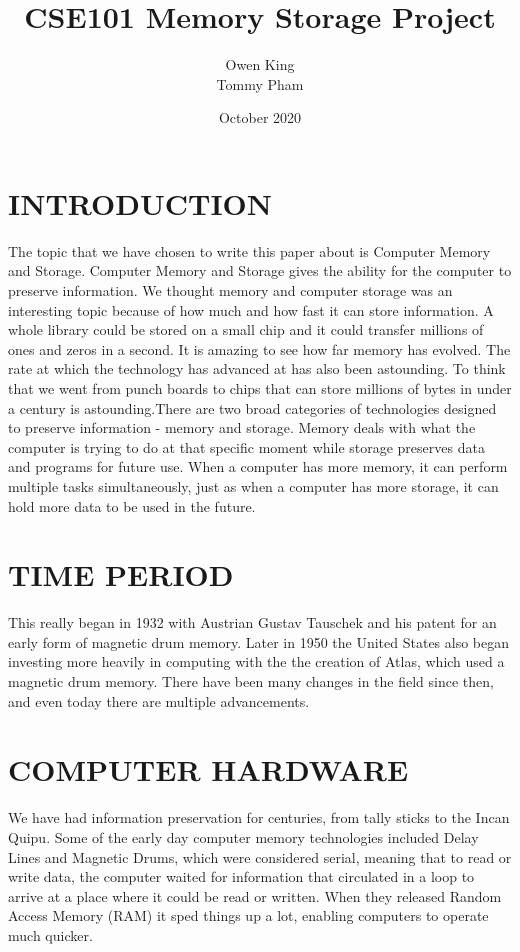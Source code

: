 \documentclass[letterpaper, 10 pt, conference]{IEEEconf}
\title{CSE101 Memory Storage Project}
\author{Owen King \\
Tommy Pham}
\date{October 2020}
\begin{document}
\maketitle
\thispagestyle{empty}
\pagestyle{empty}

\section{INTRODUCTION}

The topic that we have chosen to write this paper about is Computer Memory and Storage. Computer Memory and Storage gives the ability for the computer to preserve information. We thought memory and computer storage was an interesting topic because of how much and how fast it can store information. A whole library could be stored on a small chip and it could transfer millions of ones and zeros in a second. It is amazing to see how far memory has evolved. The rate at which the technology has advanced at has also been astounding. To think that we went from punch boards to chips that can store millions of bytes in under a century is astounding.There are two broad categories of technologies designed to preserve information - memory and storage. Memory deals with what the computer is trying to do at that specific moment while storage preserves data and programs for future use. When a computer has more memory, it can perform multiple tasks simultaneously, just as when a computer has more storage, it can hold more data to be used in the future. 

\section{TIME PERIOD}

This really began in 1932 with Austrian Gustav Tauschek and his patent for an early form of magnetic drum memory. Later in 1950 the United States also began investing more heavily in computing with the the creation of Atlas, which used a magnetic drum memory. There have been many changes in the field since then, and even today there are multiple advancements.

\section{COMPUTER HARDWARE}

We have had information preservation for centuries, from tally sticks to the Incan Quipu. Some of the early day computer memory technologies included Delay Lines and Magnetic Drums, which were considered serial, meaning that to read or write data, the computer waited for information that circulated in a loop to arrive at a place where it could be read or written. When they released Random Access Memory (RAM) it sped things up a lot, enabling computers to operate much quicker. \\
\end{document}

